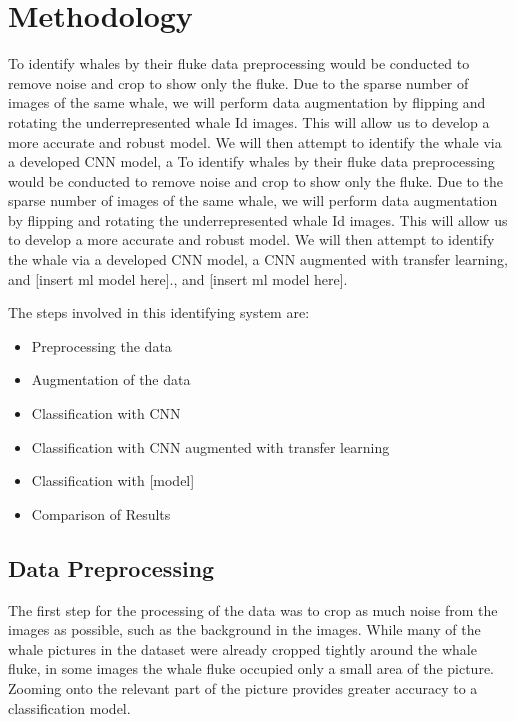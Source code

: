 \documentclass[paper=a4, fontsize=11pt]{scrartcl}
\numberwithin{equation}{section}		%
\numberwithin{table}{section}				%
\begin{document}
\section{Methodology}\label{sec: meth}



To identify whales by their fluke data preprocessing would be conducted to remove noise and crop to show only the fluke. Due to the sparse number of images of the same whale, we will perform data augmentation by flipping and rotating the underrepresented whale Id images. This will allow us to develop a more accurate and robust model. We will then attempt to identify the whale via a developed CNN model, a To identify whales by their fluke data preprocessing would be conducted to remove noise and crop to show only the fluke. Due to the sparse number of images of the same whale, we will perform data augmentation by flipping and rotating the underrepresented whale Id images. This will allow us to develop a more accurate and robust model. We will then attempt to identify the whale via a developed CNN model, a CNN augmented with transfer learning, and [insert ml model here]., and [insert ml model here].

The steps involved in this identifying system are:
\begin{itemize}
    \item Preprocessing the data
    \item Augmentation of the data
    \item Classification with CNN
    \item Classification with CNN augmented with transfer learning
    \item Classification with [model]
    \item Comparison of Results
\end{itemize}

\subsection{Data Preprocessing}\label{subsec:Preprocessing}

The first step for the processing of the data was to crop as much noise from the images as possible, such as the background in the images. While many of the whale pictures in the dataset were already cropped tightly around the whale fluke, in some images the whale fluke occupied only a small area of the picture. Zooming onto the relevant part of the picture provides greater accuracy to a classification model. 
\end{document}
